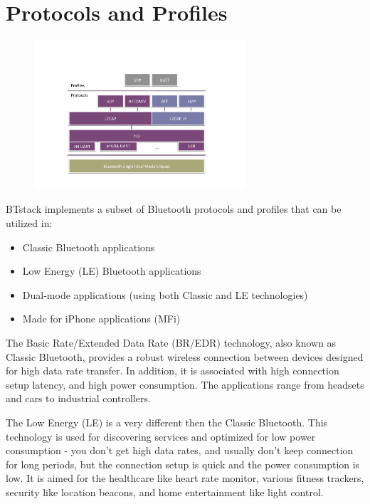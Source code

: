 \section{Protocols and Profiles}
\label{section:protocols_profiles}
\begin{figure}[htbp] %
   \centering
   \includegraphics[width=0.7\textwidth]{picts/btstack-protocols.pdf} 
   \caption{}
   \label{fig:BTstackProtocolArchitecture}
\end{figure}

\pagebreak
BTstack implements a subset of Bluetooth protocols and profiles that can be utilized in:
\begin{itemize}
\item Classic Bluetooth applications
\item Low Energy (LE) Bluetooth applications
\item Dual-mode applications (using both Classic and LE technologies) 
\item Made for iPhone applications (MFi)
\end{itemize}
 
The Basic Rate/Extended Data Rate (BR/EDR) technology, also known as Classic Bluetooth, provides  a robust wireless connection between devices designed for high data rate transfer. In addition, it is associated with high connection setup latency, and high power consumption. The applications range from headsets and cars to industrial controllers. 

The Low Energy (LE) is a very different then the Classic Bluetooth. This technology is used for discovering services and optimized for low power consumption - you don't get high data rates,   and usually don't keep connection for long periods, but the connection setup is quick and the power consumption is low. It is aimed for the healthcare like heart rate monitor, various fitness trackers, security like location beacons, and home entertainment like light control.

